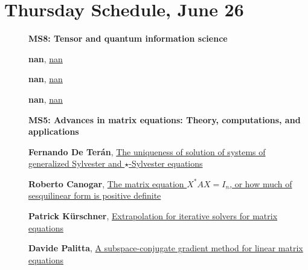 \documentclass[ILAS2025-program.tex]{subfiles}
\begin{document}
\section*{Thursday Schedule, June 26 }
        
        \begin{description}
    \item[] {\color{mstitle}\textbf{MS8: Tensor and quantum information science}} 
    \item[] \hypertarget{up0283}{}\textbf{nan}, \hyperlink{down0283}{nan}
        \item[] \hypertarget{up0284}{}\textbf{nan}, \hyperlink{down0284}{nan}
        \item[] \hypertarget{up0285}{}\textbf{nan}, \hyperlink{down0285}{nan}
        \end{description}
    \begin{description}
    \item[] {\color{mstitle}\textbf{MS5: Advances in matrix equations: Theory, computations, and applications}} 
    \item[] \hypertarget{up0319}{}\textbf{Fernando De Terán}, \hyperlink{down0319}{The uniqueness of solution of systems of generalized Sylvester and $\star$-Sylvester equations}
        \item[] \hypertarget{up0320}{}\textbf{Roberto Canogar}, \hyperlink{down0320}{The matrix equation $X^*AX=I_n$, or how much of sesquilinear form is positive definite
}
        \item[] \hypertarget{up0321}{}\textbf{Patrick Kürschner}, \hyperlink{down0321}{Extrapolation for iterative solvers for matrix equations
}
        \item[] \hypertarget{up0322}{}\textbf{Davide Palitta}, \hyperlink{down0322}{A subspace-conjugate gradient method for linear matrix equations
}
        \end{description}
\end{document}
